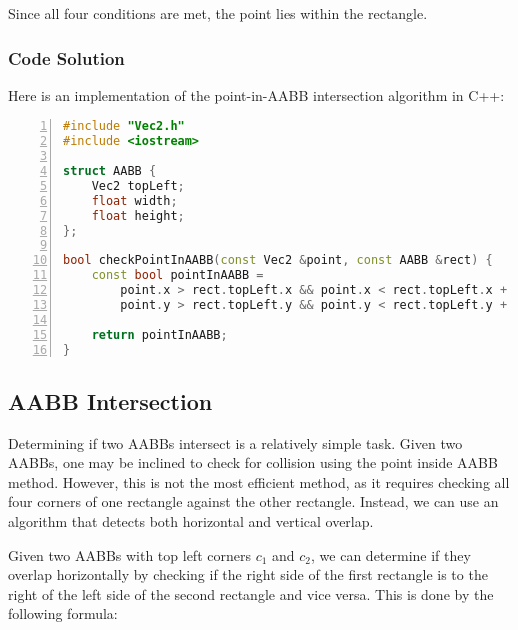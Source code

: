 Since all four conditions are met, the point lies within the rectangle.

\subsubsection{Code Solution}

Here is an implementation of the point-in-AABB intersection algorithm in C++:

\begin{mdframed}[linecolor=black!30!white,linewidth=.5pt,extratopheight=1em]
    \begin{lstlisting}[language=C++, aboveskip=3mm,
        belowskip=3mm,
        showstringspaces=false,
        columns=flexible,
        basicstyle={\small\ttfamily},
        numbers=left,
        numberstyle=\tiny\color{gray},
        keywordstyle=\color{blue},
        commentstyle=\color{dkgreen},
        stringstyle=\color{mauve},
        breaklines=true,
        breakatwhitespace=true,
        tabsize=3,
        xleftmargin=1em]
#include "Vec2.h"
#include <iostream>

struct AABB {
    Vec2 topLeft;
    float width;
    float height;
};

bool checkPointInAABB(const Vec2 &point, const AABB &rect) {
    const bool pointInAABB = 
        point.x > rect.topLeft.x && point.x < rect.topLeft.x + rect.width &&
        point.y > rect.topLeft.y && point.y < rect.topLeft.y + rect.height;

    return pointInAABB;
}

\end{lstlisting}
\end{mdframed}

\subsection{AABB Intersection}

Determining if two AABBs intersect is a relatively simple task. Given two
AABBs, one may be inclined to check for collision using the point inside AABB
method. However, this is not the most efficient method, as it requires checking
all four corners of one rectangle against the other rectangle. Instead, we can
use an algorithm that detects both horizontal and vertical overlap.

Given two AABBs with top left corners $c_1$ and $c_2$, we can determine if they
overlap horizontally by checking if the right side of the first rectangle is to
the right of the left side of the second rectangle and vice versa. This is done
by the following formula:


